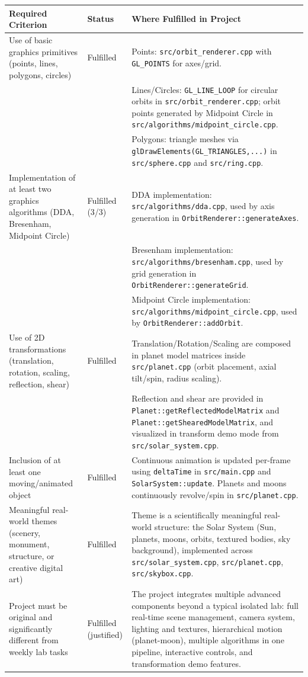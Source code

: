 \documentclass[11pt,a4paper]{article}
\begin{document}
\begin{tabularx}{\textwidth}{@{}p{}p{}p{}@{}}
\toprule
\textbf{Required Criterion} & \textbf{Status} & \textbf{Where Fulfilled in Project} \\
\midrule
Use of basic graphics primitives (points, lines, polygons, circles) & Fulfilled &
Points: \texttt{src/orbit\_renderer.cpp} with \texttt{GL\_POINTS} for axes/grid. \\
& &
Lines/Circles: \texttt{GL\_LINE\_LOOP} for circular orbits in \texttt{src/orbit\_renderer.cpp}; orbit points generated by Midpoint Circle in \texttt{src/algorithms/midpoint\_circle.cpp}. \\
& &
Polygons: triangle meshes via \texttt{glDrawElements(GL\_TRIANGLES,...)} in \texttt{src/sphere.cpp} and \texttt{src/ring.cpp}. \\
\midrule
Implementation of at least two graphics algorithms (DDA, Bresenham, Midpoint Circle) & Fulfilled (3/3) &
DDA implementation: \texttt{src/algorithms/dda.cpp}, used by axis generation in \texttt{OrbitRenderer::generateAxes}. \\
& &
Bresenham implementation: \texttt{src/algorithms/bresenham.cpp}, used by grid generation in \texttt{OrbitRenderer::generateGrid}. \\
& &
Midpoint Circle implementation: \texttt{src/algorithms/midpoint\_circle.cpp}, used by \texttt{OrbitRenderer::addOrbit}. \\
\midrule
Use of 2D transformations (translation, rotation, scaling, reflection, shear) & Fulfilled &
Translation/Rotation/Scaling are composed in planet model matrices inside \texttt{src/planet.cpp} (orbit placement, axial tilt/spin, radius scaling). \\
& &
Reflection and shear are provided in \texttt{Planet::getReflectedModelMatrix} and \texttt{Planet::getShearedModelMatrix}, and visualized in transform demo mode from \texttt{src/solar\_system.cpp}. \\
\midrule
Inclusion of at least one moving/animated object & Fulfilled &
Continuous animation is updated per-frame using \texttt{deltaTime} in \texttt{src/main.cpp} and \texttt{SolarSystem::update}. Planets and moons continuously revolve/spin in \texttt{src/planet.cpp}. \\
\midrule
Meaningful real-world themes (scenery, monument, structure, or creative digital art) & Fulfilled &
Theme is a scientifically meaningful real-world structure: the Solar System (Sun, planets, moons, orbits, textured bodies, sky background), implemented across \texttt{src/solar\_system.cpp}, \texttt{src/planet.cpp}, \texttt{src/skybox.cpp}. \\
\midrule
Project must be original and significantly different from weekly lab tasks & Fulfilled (justified) &
The project integrates multiple advanced components beyond a typical isolated lab: full real-time scene management, camera system, lighting and textures, hierarchical motion (planet-moon), multiple algorithms in one pipeline, interactive controls, and transformation demo features. \\
\bottomrule
\end{tabularx}
\end{document}
